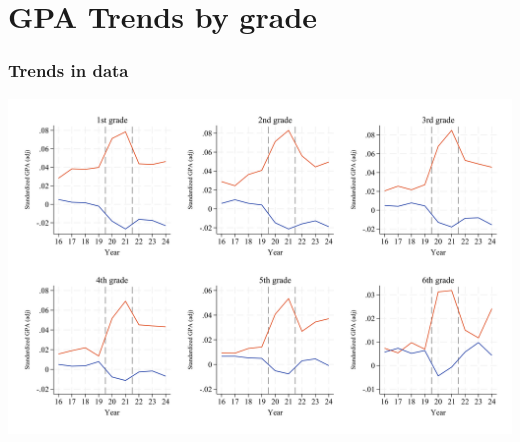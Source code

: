 \documentclass{beamer}
\newcommand{\highlightboxflex}[5]{%
    \tikz[overlay,remember picture]{
        \filldraw[ultra thick, rounded corners, #5] 
        ([shift={(#1,#2)}]current page.center) rectangle 
        ([shift={(#1+#3,#2+#4)}]current page.center);
    }
}
\begin{document}

\section{GPA Trends by grade}




\begin{frame}
    \label{frame:gpa_trends_grades_elm}
    \frametitle{Trends in data}
               \includegraphics[width=\textwidth]{./FIGURES/Descriptive/raw_grades_elm_std_gpa_m_adj_Tsiblings_Sall_Size2_4.pdf}    
    \begin{flushleft}
        \hyperlink{frame:gpa_trends}{}
    \end{flushleft}   
    
    
\end{frame}
\end{document}
